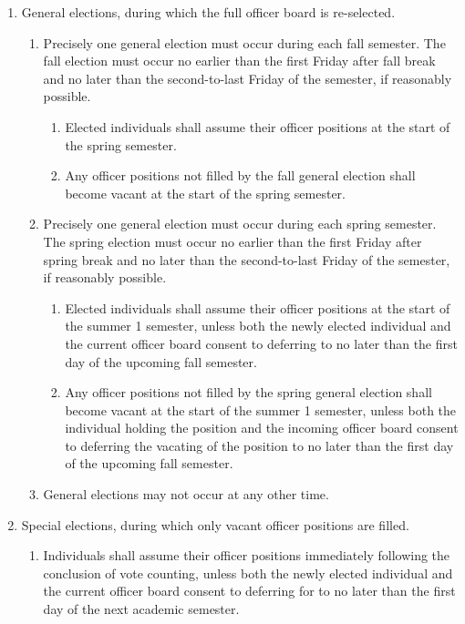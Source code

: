 \documentclass[11pt]{article}
\newcounter{h1}
\newcounter{h2}[h1]
\newcounter{h3}[h2]
\begin{document}
\begin{enumerate}
  \item General elections, during which the full officer board is re-selected.  
  \begin{enumerate}
    \item Precisely one general election must occur during each fall semester. The fall election must occur no earlier than the first Friday after fall break and no later than the second-to-last Friday of the semester, if reasonably possible.  
    \begin{enumerate}
      \item Elected individuals shall assume their officer positions at the start of the spring semester.  
      \item Any officer positions not filled by the fall general election shall become vacant at the start of the spring semester.  
    \end{enumerate}
    \item Precisely one general election must occur during each spring semester. The spring election must occur no earlier than the first Friday after spring break and no later than the second-to-last Friday of the semester, if reasonably possible.  
    \begin{enumerate}
      \item Elected individuals shall assume their officer positions at the start of the summer 1 semester, unless both the newly elected individual and the current officer board consent to deferring to no later than the first day of the upcoming fall semester.  
      \item Any officer positions not filled by the spring general election shall become vacant at the start of the summer 1 semester, unless both the individual holding the position and the incoming officer board consent to deferring the vacating of the position to no later than the first day of the upcoming fall semester.  
    \end{enumerate}
    \item General elections may not occur at any other time.  
  \end{enumerate}
  \item Special elections, during which only vacant officer positions are filled.  
  \begin{enumerate}
    \item Individuals shall assume their officer positions immediately following the conclusion of vote counting, unless both the newly elected individual and the current officer board consent to deferring for to no later than the first day of the next academic semester.
  \end{enumerate}
\end{enumerate}
\end{document}
